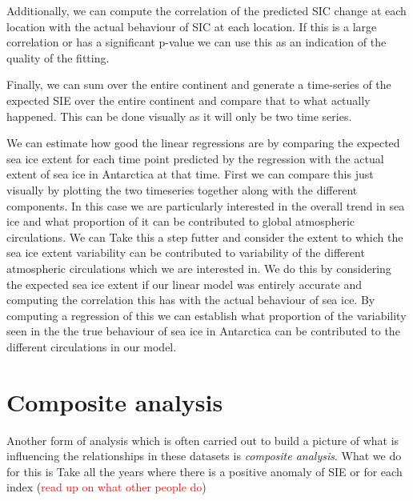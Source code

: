 \documentclass[../main.tex]{subfiles}
\begin{document}
Additionally, we can compute the correlation of the predicted SIC change at each location with the actual behaviour of SIC at each location. If this is a large correlation or has a significant p-value we can use this as an indication of the quality of the fitting.

Finally, we can sum over the entire continent and generate a time-series of the expected SIE over the entire continent and compare that to what actually happened. This can be done visually as it will only be two time series. 

We can estimate how good the linear regressions are by comparing the expected sea ice extent for each time point predicted by the regression with the actual extent of sea ice in Antarctica at that time. First we can compare this just visually by plotting the two timeseries together along with the different components. In this case we are particularly interested in the overall trend in sea ice and what proportion of it can be contributed to global atmospheric circulations. We can Take this a step futter and consider the extent to which the sea ice extent variability can be contributed to variability of the different atmospheric circulations which we are interested in. We do this by considering the expected sea ice extent if our linear model was entirely accurate and computing the correlation this has with the actual behaviour of sea ice. By computing a regression of this we can establish what proportion of the variability seen in the the true behaviour of sea ice in Antarctica can be contributed to the different circulations in our model.

\section{Composite analysis}

Another form of analysis which is often carried out to build a picture of what is influencing the relationships in these datasets is \textit{composite analysis}. What we do for this is Take all the years where there is a positive anomaly of SIE or for each index (\textcolor{red}{read up on what other people do})
\end{document}
